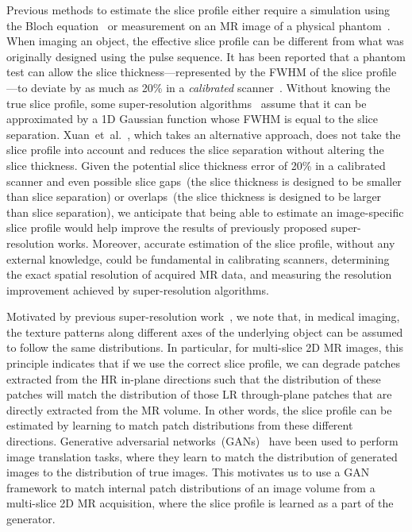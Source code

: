 \documentclass[runningheads]{llncs}
\begin{document}
Previous methods to estimate the slice profile either require a
simulation using the Bloch equation~\cite{liu-2002-bloch} or
measurement on an MR image of a physical
phantom~\cite{lerski-1989-phantom, college-2018-guide}. When imaging
an object, the effective slice profile can be different from what was
originally designed using the pulse sequence. It has been reported
that a phantom test can allow the slice thickness---represented by the
FWHM of the slice profile---to deviate by as much as 20\% in a
\textit{calibrated} scanner~\cite{college-2018-guide}. Without knowing
the true slice profile, some super-resolution
algorithms~\cite{zhao-2018-smore} assume that it can be approximated
by a 1D Gaussian function whose FWHM is equal to the slice separation.
Xuan~et~al.~\cite{xuan-2020-arxiv}, which takes an alternative
approach, does not take the slice profile into account and reduces the
slice separation without altering the slice thickness.  Given the
potential slice thickness error of 20\% in a calibrated scanner and
even possible slice gaps~(the slice thickness is designed to be
smaller than slice separation) or overlaps~(the slice thickness is
designed to be larger than slice separation), we anticipate that being
able to estimate an image-specific slice profile would help improve
the results of previously proposed super-resolution works. Moreover,
accurate estimation of the slice profile, without any external
knowledge, could be fundamental in calibrating scanners, determining
the exact spatial resolution of acquired MR data, and measuring the
resolution improvement achieved by super-resolution algorithms.

Motivated by previous super-resolution work~\cite{weigert-2017-fm,
zhao-2018-smore}, we note that, in medical imaging, the
texture patterns along different axes of the underlying object can be
assumed to follow the same distributions. In particular, for
multi-slice 2D MR images, this principle indicates that if we use the
correct slice profile, we can degrade patches extracted from the HR
in-plane directions such that the distribution of these patches
will match the distribution of those LR through-plane patches that
are directly extracted from the MR volume. In other words, the slice
profile can be estimated by learning to match patch distributions from
these different directions. Generative adversarial
networks~(GANs)~\cite{goodfellow-2014-gan} have been used to perform
image translation tasks, where they learn to match the distribution of
generated images to the distribution of true images. This motivates us
to use a GAN framework to match internal patch
distributions of an image volume from a multi-slice 2D MR acquisition,
where the slice profile is learned as a part of the generator.
\end{document}
